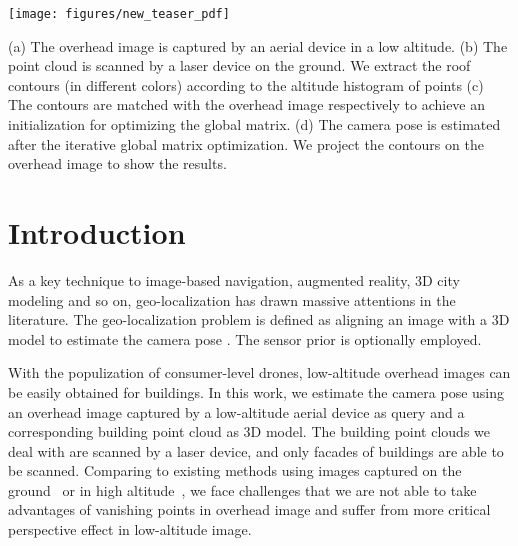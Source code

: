 
\begin{teaserfigure}
	\texttt{[image: figures/new\_teaser\_pdf]}
	\caption{(a) The overhead image is captured by an aerial device in a low altitude. (b) The point cloud is scanned by a laser device on the ground. We extract the roof contours (in different colors) according to the altitude histogram of points (c) The contours are matched with the overhead image respectively to achieve an initialization for optimizing the global matrix. (d) The camera pose is estimated after the iterative global matrix optimization. We project the contours on the overhead image to show the results.}
	\label{fig:teaser}
\end{teaserfigure}


\maketitle



\section{Introduction}
%
As a key technique to image-based navigation, augmented reality, 3D city modeling and so on, geo-localization has drawn massive attentions in the literature. 
%
The geo-localization problem is defined as aligning an image with a 3D model to estimate the camera pose  .
%
The sensor prior is optionally employed. 

 
%
%


%
With the populization of consumer-level drones, low-altitude overhead images can be easily obtained for buildings.
%
In this work, we estimate the camera pose using an overhead image captured by a low-altitude aerial device as query and a corresponding building point cloud as 3D model. 
%
The building point clouds we deal with are scanned by a laser device, and only facades of buildings are able to be scanned. 
%
Comparing to existing methods using images captured on the ground~\cite{Arth} or in high altitude~\cite{Karl, Zhang}, we face challenges that we are not able to take advantages of vanishing points in overhead image and suffer from more critical perspective effect in low-altitude image. 

